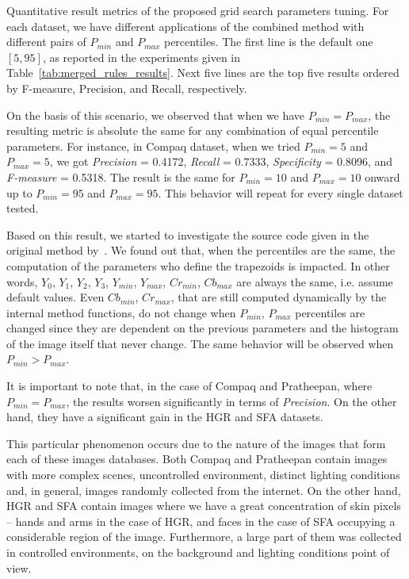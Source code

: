 \begin{table*}[ht]
\caption[Quantitative result metrics of the proposed grid search parameters tuning]{Quantitative result metrics of the proposed grid search parameters tuning. For each dataset, we have different applications of the combined method with different pairs of $P_{min}$ and $P_{max}$ percentiles. The first line is the default one $[5, 95]$, as reported in the experiments given in Table~\ref{tab:merged_rules_results}. Next five lines are the top five results ordered by F-measure, Precision, and Recall, respectively.}
\label{tab:gs_results_comparison}

\end{table*}

On the basis of this scenario, we observed that when we have $P_{min} = P_{max}$, the resulting metric is absolute the same for any combination of equal percentile parameters. For instance, in Compaq dataset, when we tried $P_{min} = 5$ and $P_{max} = 5$, we got \emph{Precision} = 0.4172, \emph{Recall} = 0.7333, \emph{Specificity} = 0.8096, and \emph{F-measure} = 0.5318. The result is the same for $P_{min} = 10$ and $P_{max} = 10$ onward up to $P_{min} = 95$ and $P_{max} = 95$. This behavior will repeat for every single dataset tested.

Based on this result, we started to investigate the source code given in the original method by~\citet{brancati:17}. We found out that, when the percentiles are the same, the computation of the parameters who define the trapezoids is impacted. In other words, $Y_0$, $Y_1$, $Y_2$, $Y_3$, $Y_{min}$, $Y_{max}$, $Cr_{min}$, $Cb_{max}$ are always the same, i.e. assume default values. Even $Cb_{min}$, $Cr_{max}$, that are still computed dynamically by the internal method functions, do not change when $P_{min}$, $P_{max}$ percentiles are changed since they are dependent on the previous parameters and the histogram of the image itself that never change. The same behavior will be observed when $P_{min} > P_{max}$.

It is important to note that, in the case of Compaq and Pratheepan, where $P_{min} = P_{max}$, the results worsen significantly in terms of \emph{Precision}. On the other hand, they have a significant gain in the HGR and SFA datasets.

This particular phenomenon occurs due to the nature of the images that form each of these images databases. Both Compaq and Pratheepan contain images with more complex scenes, uncontrolled environment, distinct lighting conditions and, in general, images randomly collected from the internet. On the other hand, HGR and SFA contain images where we have a great concentration of skin pixels -- hands and arms in the case of HGR, and faces in the case of SFA occupying a considerable region of the image. Furthermore, a large part of them was collected in controlled environments, on the background and lighting conditions point of view.

